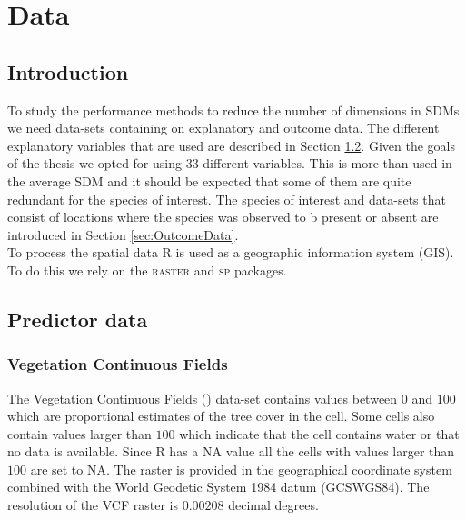 \chapter{Data}
\label{ch:DataCommonlyUsedInSpeciesDistributionModels}

\section{Introduction}
To study the performance methods to reduce the number of dimensions in SDMs we need data-sets containing on explanatory and outcome data. The different explanatory variables that are used are described in Section \ref{sec:PredictorData}. Given the goals of the thesis we opted for using $33$ different variables. This is more than used in the average SDM and it should be expected that some of them are quite redundant for the species of interest. The species of interest and data-sets that consist of locations where the species was observed to b present or absent are introduced in Section \ref{sec:OutcomeData}.  \\

To process the spatial data R \parencite{RProg} is used as a geographic information system (GIS). To do this we rely on the \textsc{raster} \parencite{raster} and \textsc{sp} \parencite{sp} packages.
\section{Predictor data}
\label{sec:PredictorData}

\subsection{Vegetation Continuous Fields}
The Vegetation Continuous Fields () data-set contains values between $0$ and $100$ which are proportional estimates of the tree cover in the cell. Some cells also contain values larger than $100$ which indicate that the cell contains water or that no data is available. Since R has a \textsc{NA} value all the cells with values larger than $100$ are set to \textsc{NA}. The raster is provided in the geographical coordinate system combined with the World Geodetic System 1984 datum (GCS\textunderscore WGS84). The resolution of the VCF raster is $0.00208$ decimal degrees.

